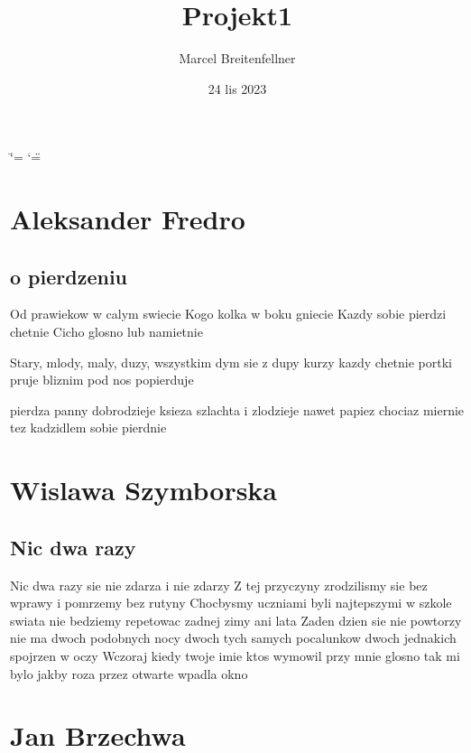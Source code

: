 \documentclass[letterpaper,10pt,polish]{sphinxmanual}
\title{Projekt1}
\date{24 lis 2023}
\author{Marcel Breitenfellner}
\begin{document}
\ifdefined\shorthandoff
  \ifnum\catcode`\=\string=\active\shorthandoff{=}\fi
  \ifnum\catcode`\"=\active{}\fi
\fi

\pagestyle{empty}
\sphinxmaketitle
\pagestyle{plain}
\sphinxtableofcontents
\pagestyle{normal}
\label{\detokenize{index::doc}}


\sphinxstepscope


\chapter{Aleksander Fredro}
\label{\detokenize{Wiersz1:aleksander-fredro}}\label{\detokenize{Wiersz1::doc}}

\section{o pierdzeniu}
\label{\detokenize{Wiersz1:o-pierdzeniu}}
\sphinxAtStartPar
Od prawiekow w calym swiecie
Kogo kolka w boku gniecie
Kazdy sobie pierdzi chetnie
Cicho glosno lub namietnie

\sphinxAtStartPar
Stary, mlody, maly, duzy,
wszystkim dym sie z dupy kurzy
kazdy chetnie portki pruje
bliznim pod nos popierduje

\sphinxAtStartPar
pierdza panny dobrodzieje
ksieza szlachta i zlodzieje
nawet papiez chociaz miernie
tez kadzidlem sobie pierdnie

\sphinxstepscope


\chapter{Wislawa Szymborska}
\label{\detokenize{Wiersz2:wislawa-szymborska}}\label{\detokenize{Wiersz2::doc}}

\section{Nic dwa razy}
\label{\detokenize{Wiersz2:nic-dwa-razy}}
\sphinxAtStartPar
Nic dwa razy sie nie zdarza
i nie zdarzy Z tej przyczyny
zrodzilismy sie bez wprawy
i pomrzemy bez rutyny
Chocbysmy uczniami byli
najtepszymi w szkole swiata
nie bedziemy repetowac
zadnej zimy ani lata
Zaden dzien sie nie powtorzy
nie ma dwoch podobnych nocy
dwoch tych samych pocalunkow
dwoch jednakich spojrzen w oczy
Wczoraj kiedy twoje imie
ktos wymowil przy mnie glosno
tak mi bylo jakby roza
przez otwarte wpadla okno

\sphinxstepscope


\chapter{Jan Brzechwa}
\label{\detokenize{Wiersz3:jan-brzechwa}}\label{\detokenize{Wiersz3::doc}}
\end{document}
